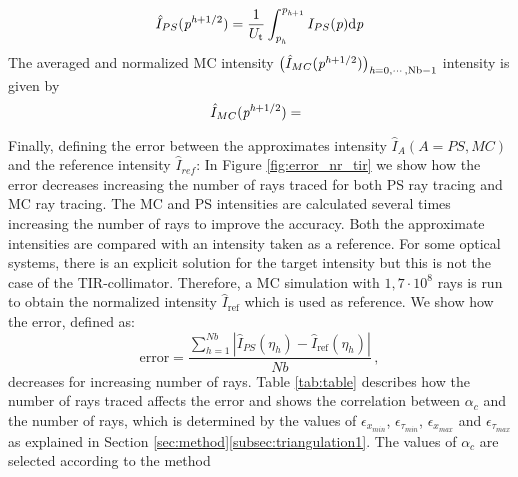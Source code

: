 \begin{equation}\label{eq:normalized_PS_intensity}
\hat{I}_{PS}(\textit{p}^{\textit{h}+1/2}) = \frac{1}{U_{\textrm{t}}}\int_{\textit{p}_{\textit{h}}}^{\textit{p}_{\textit{h}+1}} I_{PS}(\textit{p})\textrm{d}\textit{p}
\end{equation}
The averaged and normalized MC intensity $\big(\hat{I}_{MC}(\textit{p}^{\textit{h}+1/2})\big)_{\textit{h} = 0, \cdots, \textrm{Nb}-1}$ intensity is given by
\begin{equation}\label{eq:normalized_MC_intensity}
\hat{I}_{MC}(\textit{p}^{\textit{h}+1/2}) = \frac{}{}
\end{equation} 
Finally, defining the error between the approximates intensity $\hat{I}_{A} (A = PS, MC)$ and the reference intensity $\hat{I}_{ref}$:
In Figure \ref{fig:error_nr_tir} we show how the error decreases increasing the number of rays traced for both PS ray tracing and MC ray tracing.
The MC and PS intensities are calculated several times increasing the number of rays to improve the accuracy.
Both the approximate intensities are compared with an intensity taken as a reference.
For some optical systems, there is an explicit solution for the target intensity but this is not the case of the TIR-collimator.
Therefore, a MC simulation with $1,7 \cdot 10^8$ rays is run to obtain the normalized intensity $\hat{I}_{\mbox{ref}}$ which is used as reference.
We show how the error,
defined as:
\begin{equation}\label{error}
\mbox{error} = \frac{\sum_{h = 1}^{Nb}| \hat{I}_{PS}(\eta_h) - \hat{I}_{\mbox{ref}}(\eta_h)|}{Nb}\,,
\end{equation}
decreases for increasing number of rays.
Table \ref{tab:table} describes how the number of rays traced affects the error and shows the correlation between $\alpha_c$ and the number of rays, which is
determined by the values of $\epsilon_{x_{min}}$, $\epsilon_{\tau_{min}}$, $\epsilon_{x_{max}}$ and $\epsilon_{\tau_{max}}$ as explained in Section \ref{sec:method}\ref{subsec:triangulation1}. The values of $\alpha_c$ are selected according to the method
